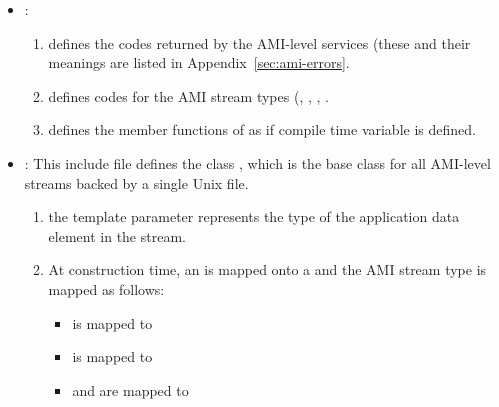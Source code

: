 \begin{itemize}
    \item {}: 
    \begin{enumerate}     
        \item defines the  codes returned by
        the AMI-level services (these and their meanings are
        listed in Appendix~\ref{sec:ami-errors}.

        \item defines codes for the AMI stream types
        (, ,
        ,
        .
  
        \item defines the member functions of
         as  if compile
        time variable  is defined.
    \end{enumerate}    
    
    \item {}: This include file
    defines the class , which is the
    base class for all AMI-level streams backed by a single
    Unix file.
    \begin{enumerate}

        \item the template parameter 
        represents the type of the application data element
        in the stream.
        
        \item At construction time, an
         is mapped onto a
         and the AMI stream type is
        mapped as follows:
        \begin{itemize}
            \item {} is mapped to
            \item {} is mapped to
            \item {} and
             are mapped to
        \end{itemize}
        

\end{enumerate}
\end{itemize}
